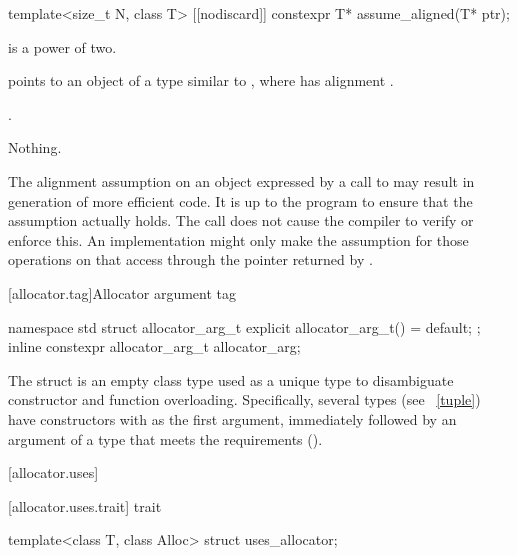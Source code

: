 %
\begin{itemdecl}
template<size_t N, class T>
  [[nodiscard]] constexpr T* assume_aligned(T* ptr);
\end{itemdecl}

\begin{itemdescr}
\pnum
\mandates
{} is a power of two.

\pnum
\expects
{} points to an object  of
a type similar to ,
where  has alignment .

\pnum
\returns
{}.

\pnum
\throws
Nothing.

\pnum
\begin{note}
The alignment assumption on an object 
expressed by a call to 
may result in generation of more efficient code.
It is up to the program to ensure that the assumption actually holds.
The call does not cause the compiler to verify or enforce this.
An implementation might only make the assumption
for those operations on  that access 
through the pointer returned by .
\end{note}
\end{itemdescr}

[allocator.tag]{Allocator argument tag}

%
%
\begin{itemdecl}
namespace std {
  struct allocator_arg_t { explicit allocator_arg_t() = default; };
  inline constexpr allocator_arg_t allocator_arg{};
}
\end{itemdecl}

\pnum
The  struct is an empty class type used as a unique type to
disambiguate constructor and function overloading. Specifically, several types (see
~\ref{tuple}) have constructors with  as the first
argument, immediately followed by an argument of a type that meets the
 requirements ().

[allocator.uses]{}

[allocator.uses.trait]{ trait}

%
\begin{itemdecl}
template<class T, class Alloc> struct uses_allocator;
\end{itemdecl}

